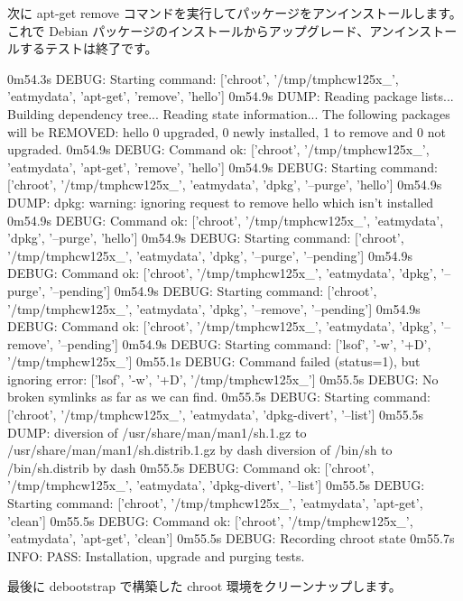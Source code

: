 \documentclass[mingoth,a4paper]{jsarticle}
\begin{document}
次に apt-get remove コマンドを実行してパッケージをアンインストールします。
これで Debian パッケージのインストールからアップグレード、アンインストールするテストは終了です。

\begin{commandline}
0m54.3s DEBUG: Starting command: ['chroot', '/tmp/tmphcw125x_', 'eatmydata', 'apt-get', 'remove', 'hello']
0m54.9s DUMP:
  Reading package lists...
  Building dependency tree...
  Reading state information...
  The following packages will be REMOVED:
    hello
  0 upgraded, 0 newly installed, 1 to remove and 0 not upgraded.
0m54.9s DEBUG: Command ok: ['chroot', '/tmp/tmphcw125x_', 'eatmydata', 'apt-get', 'remove', 'hello']
0m54.9s DEBUG: Starting command: ['chroot', '/tmp/tmphcw125x_', 'eatmydata', 'dpkg', '--purge', 'hello']
0m54.9s DUMP:
  dpkg: warning: ignoring request to remove hello which isn't installed
0m54.9s DEBUG: Command ok: ['chroot', '/tmp/tmphcw125x_', 'eatmydata', 'dpkg', '--purge', 'hello']
0m54.9s DEBUG: Starting command: ['chroot', '/tmp/tmphcw125x_', 'eatmydata', 'dpkg', '--purge', '--pending']
0m54.9s DEBUG: Command ok: ['chroot', '/tmp/tmphcw125x_', 'eatmydata', 'dpkg', '--purge', '--pending']
0m54.9s DEBUG: Starting command: ['chroot', '/tmp/tmphcw125x_', 'eatmydata', 'dpkg', '--remove', '--pending']
0m54.9s DEBUG: Command ok: ['chroot', '/tmp/tmphcw125x_', 'eatmydata', 'dpkg', '--remove', '--pending']
0m54.9s DEBUG: Starting command: ['lsof', '-w', '+D', '/tmp/tmphcw125x_']
0m55.1s DEBUG: Command failed (status=1), but ignoring error: ['lsof', '-w', '+D', '/tmp/tmphcw125x_']
0m55.5s DEBUG: No broken symlinks as far as we can find.
0m55.5s DEBUG: Starting command: ['chroot', '/tmp/tmphcw125x_', 'eatmydata', 'dpkg-divert', '--list']
0m55.5s DUMP:
  diversion of /usr/share/man/man1/sh.1.gz to /usr/share/man/man1/sh.distrib.1.gz by dash
  diversion of /bin/sh to /bin/sh.distrib by dash
0m55.5s DEBUG: Command ok: ['chroot', '/tmp/tmphcw125x_', 'eatmydata', 'dpkg-divert', '--list']
0m55.5s DEBUG: Starting command: ['chroot', '/tmp/tmphcw125x_', 'eatmydata', 'apt-get', 'clean']
0m55.5s DEBUG: Command ok: ['chroot', '/tmp/tmphcw125x_', 'eatmydata', 'apt-get', 'clean']
0m55.5s DEBUG: Recording chroot state
0m55.7s INFO: PASS: Installation, upgrade and purging tests.
\end{commandline}

最後に debootstrap で構築した chroot 環境をクリーンナップします。
\end{document}
